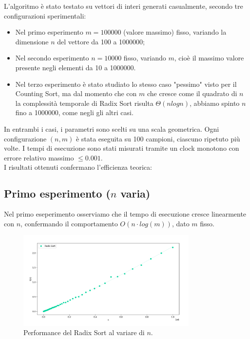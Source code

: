 \documentclass[a4paper, 12pt, oneside]{book}
\begin{document}
L'algoritmo è stato testato su vettori di interi generati casualmente, secondo tre configurazioni sperimentali:

\begin{itemize}
    \item Nel primo esperimento \(m = 100000\) (valore massimo) fisso, variando la dimensione \(n\) del vettore da 100 a 1000000;
    \item Nel secondo esperimento \(n = 10000\) fisso, variando \(m\), cioè il massimo valore presente negli elementi da 10 a 1000000.
    \item Nel terzo esperimento è stato studiato lo stesso caso "pessimo" visto per il Counting Sort, ma dal momento che con \(m\) che cresce come il quadrato di \(n\) la complessità temporale di Radix Sort risulta \(\Theta(nlogn)\), abbiamo spinto \(n\) fino a 1000000, come negli gli altri casi.
\end{itemize}

\noindent In entrambi i casi, i parametri sono scelti su una scala geometrica. Ogni configurazione \((n, m)\) è stata eseguita su 100 campioni, ciascuno ripetuto più volte. I tempi di esecuzione sono stati misurati tramite un clock monotono con errore relativo massimo \(\leq 0.001\). \\

\noindent I risultati ottenuti confermano l'efficienza teorica:

\subsection{Primo esperimento ($n$ varia)}

Nel primo eseperimento osserviamo che il tempo di esecuzione cresce linearmente con \(n\), confermando il comportamento \(O(n \cdot log(m))\), dato \(m\) fisso.

\begin{figure}[H]
    \centering
    \includegraphics[width=0.8\textwidth]{images/grafico_radix_sort_n.png}
    \caption{Performance del Radix Sort al variare di \(n\).}
    \label{fig:radix_sort_way_n}
\end{figure}
\end{document}
